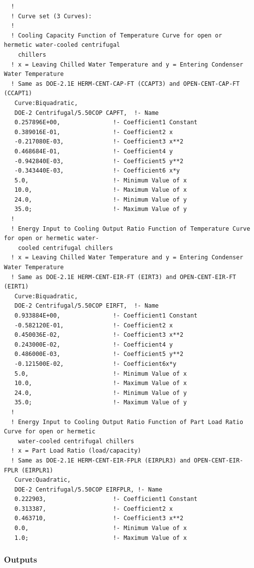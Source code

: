 \begin{lstlisting}
  !
  ! Curve set (3 Curves):
  !
  ! Cooling Capacity Function of Temperature Curve for open or hermetic water-cooled centrifugal
    chillers
  ! x = Leaving Chilled Water Temperature and y = Entering Condenser Water Temperature
  ! Same as DOE-2.1E HERM-CENT-CAP-FT (CCAPT3) and OPEN-CENT-CAP-FT (CCAPT1)
   Curve:Biquadratic,
   DOE-2 Centrifugal/5.50COP CAPFT,  !- Name
   0.257896E+00,               !- Coefficient1 Constant
   0.389016E-01,               !- Coefficient2 x
   -0.217080E-03,              !- Coefficient3 x**2
   0.468684E-01,               !- Coefficient4 y
   -0.942840E-03,              !- Coefficient5 y**2
   -0.343440E-03,              !- Coefficient6 x*y
   5.0,                        !- Minimum Value of x
   10.0,                       !- Maximum Value of x
   24.0,                       !- Minimum Value of y
   35.0;                       !- Maximum Value of y
  !
  ! Energy Input to Cooling Output Ratio Function of Temperature Curve for open or hermetic water-
    cooled centrifugal chillers
  ! x = Leaving Chilled Water Temperature and y = Entering Condenser Water Temperature
  ! Same as DOE-2.1E HERM-CENT-EIR-FT (EIRT3) and OPEN-CENT-EIR-FT (EIRT1)
   Curve:Biquadratic,
   DOE-2 Centrifugal/5.50COP EIRFT,  !- Name
   0.933884E+00,               !- Coefficient1 Constant
   -0.582120E-01,              !- Coefficient2 x
   0.450036E-02,               !- Coefficient3 x**2
   0.243000E-02,               !- Coefficient4 y
   0.486000E-03,               !- Coefficient5 y**2
   -0.121500E-02,              !- Coefficient6x*y
   5.0,                        !- Minimum Value of x
   10.0,                       !- Maximum Value of x
   24.0,                       !- Minimum Value of y
   35.0;                       !- Maximum Value of y
  !
  ! Energy Input to Cooling Output Ratio Function of Part Load Ratio Curve for open or hermetic
    water-cooled centrifugal chillers
  ! x = Part Load Ratio (load/capacity)
  ! Same as DOE-2.1E HERM-CENT-EIR-FPLR (EIRPLR3) and OPEN-CENT-EIR-FPLR (EIRPLR1)
   Curve:Quadratic,
   DOE-2 Centrifugal/5.50COP EIRFPLR, !- Name
   0.222903,                   !- Coefficient1 Constant
   0.313387,                   !- Coefficient2 x
   0.463710,                   !- Coefficient3 x**2
   0.0,                        !- Minimum Value of x
   1.0;                        !- Maximum Value of x
\end{lstlisting}

\subsubsection{Outputs}\label{outputs-4-010}

